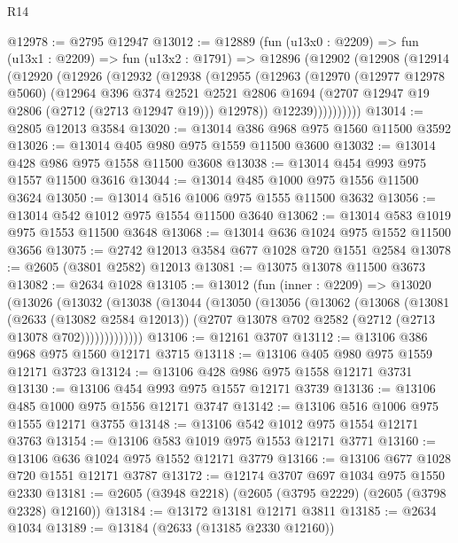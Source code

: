 \begin{lexlean}{R14}
\begin{coremodule}
@12978 := @2795 @12947
@13012 := @12889
    (fun (u13x0 : @2209) =>
    fun (u13x1 : @2209) =>
    fun (u13x2 : @1791) =>
    @12896
      (@12902
        (@12908
          (@12914
            (@12920
              (@12926
                (@12932
                  (@12938
                    (@12955
                      (@12963
                        (@12970
                          (@12977 @12978 @5060)
                          (@12964
                            @396
                            @374
                            @2521
                            @2521
                            @2806
                            @1694
                            (@2707 @12947 @19 @2806 (@2712 (@2713 @12947 @19)))
                            @12978))
                        @12239))))))))))
@13014 := @2805 @12013 @3584
@13020 := @13014 @386 @968 @975 @1560 @11500 @3592
@13026 := @13014 @405 @980 @975 @1559 @11500 @3600
@13032 := @13014 @428 @986 @975 @1558 @11500 @3608
@13038 := @13014 @454 @993 @975 @1557 @11500 @3616
@13044 := @13014 @485 @1000 @975 @1556 @11500 @3624
@13050 := @13014 @516 @1006 @975 @1555 @11500 @3632
@13056 := @13014 @542 @1012 @975 @1554 @11500 @3640
@13062 := @13014 @583 @1019 @975 @1553 @11500 @3648
@13068 := @13014 @636 @1024 @975 @1552 @11500 @3656
@13075 := @2742 @12013 @3584 @677 @1028 @720 @1551 @2584
@13078 := @2605 (@3801 @2582) @12013
@13081 := @13075 @13078 @11500 @3673
@13082 := @2634 @1028
@13105 := @13012
    (fun (inner : @2209) =>
    @13020
      (@13026
        (@13032
          (@13038
            (@13044
              (@13050
                (@13056
                  (@13062
                    (@13068
                      (@13081
                        (@2633 (@13082 @2584 @12013))
                        (@2707 @13078 @702 @2582 (@2712 (@2713 @13078 @702)))))))))))))
@13106 := @12161 @3707
@13112 := @13106 @386 @968 @975 @1560 @12171 @3715
@13118 := @13106 @405 @980 @975 @1559 @12171 @3723
@13124 := @13106 @428 @986 @975 @1558 @12171 @3731
@13130 := @13106 @454 @993 @975 @1557 @12171 @3739
@13136 := @13106 @485 @1000 @975 @1556 @12171 @3747
@13142 := @13106 @516 @1006 @975 @1555 @12171 @3755
@13148 := @13106 @542 @1012 @975 @1554 @12171 @3763
@13154 := @13106 @583 @1019 @975 @1553 @12171 @3771
@13160 := @13106 @636 @1024 @975 @1552 @12171 @3779
@13166 := @13106 @677 @1028 @720 @1551 @12171 @3787
@13172 := @12174 @3707 @697 @1034 @975 @1550 @2330
@13181 := @2605 (@3948 @2218) (@2605 (@3795 @2229) (@2605 (@3798 @2328) @12160))
@13184 := @13172 @13181 @12171 @3811
@13185 := @2634 @1034
@13189 := @13184 (@2633 (@13185 @2330 @12160))

\end{coremodule}
\end{lexlean}
